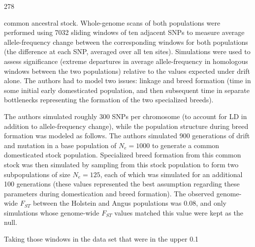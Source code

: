 \documentclass{article}
\begin{document}
278

common ancestral stock. Whole-genome scans of both populations were performed using 7032 sliding windows of ten adjacent SNPs to measure average allele-frequency change between the corresponding windows for both populations (the difference at each SNP, averaged over all ten sites). Simulations were used to assess significance (extreme departures in average allele-frequency in homologous windows between the two populations) relative to the values expected under drift alone. The authors had to model two issues: linkage and breed formation (time in some initial early domesticated population, and then subsequent time in separate bottlenecks representing the formation of the two specialized breeds).

The authors simulated roughly 300 SNPs per chromosome (to account for LD in addition to allele-frequency change), while the population structure during breed formation was modeled as follows. The authors simulated 900 generations of drift and mutation in a base population of  $ N_e = 1000 $ to generate a common domesticated stock population. Specialized breed formation from this common stock was then simulated by sampling from this stock population to form two subpopulations of size  $ N_e = 125 $, each of which was simulated for an additional 100 generations (these values represented the best assumption regarding these parameters during domestication and breed formation). The observed genome-wide  $ F_{ST} $ between the Holstein and Angus populations was 0.08, and only simulations whose genome-wide  $ F_{ST} $ values matched this value were kept as the null.

Taking those windows in the data set that were in the upper 0.1%
\end{document}
